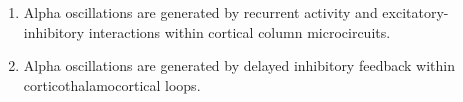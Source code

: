 \documentclass[12pt,twoside]{article}
\begin{document}
\begin{enumerate}

\item   Alpha oscillations are generated by recurrent activity and excitatory-inhibitory interactions within cortical column microcircuits.%

\item	Alpha oscillations are generated by delayed inhibitory feedback within corticothalamocortical loops.   %



\end{enumerate}
\end{document}
